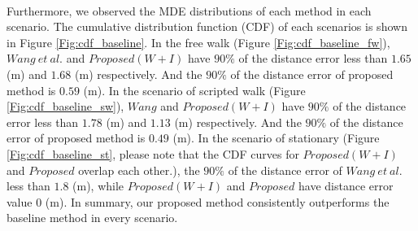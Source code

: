 \documentclass[a4paper,12pt]{report}
\begin{document}
\paragraph{}
Furthermore, we observed the MDE distributions of each method in each scenario. The cumulative distribution function (CDF) of each scenarios is shown in Figure \ref{Fig:cdf_baseline}. In the free walk (Figure \ref{Fig:cdf_baseline_fw}), $Wang\ et\ al.$ and $Proposed(W+I)$ have $90\%$ of the distance error less than $1.65$ (m) and $1.68$ (m) respectively. And the $90\%$ of the distance error of proposed method is $0.59$ (m). In the scenario of scripted walk (Figure \ref{Fig:cdf_baseline_sw}), $Wang$ and $Proposed(W+I)$ have $90\%$ of the distance error less than $1.78$ (m) and $1.13$ (m) respectively. And the $90\%$ of the distance error of proposed method is $0.49$ (m). In the scenario of stationary (Figure \ref{Fig:cdf_baseline_st}, please note that the CDF curves for $Proposed(W+I)$ and $Proposed$ overlap each other.), the $90\%$ of the distance error of $Wang\ et\ al.$ less than $1.8$ (m), while $Proposed(W+I)$ and $Proposed$ have distance error value $0$ (m). In summary, our proposed method consistently outperforms the baseline method in every scenario.
\end{document}

